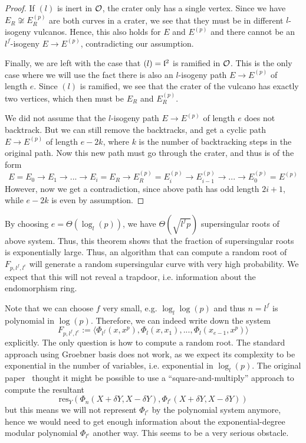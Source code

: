 \begin{proof}
    If $(l)$ is inert in $\mathcal{O}$, the crater only has a single vertex.
    Since we have $E_R \not\cong E_R^{(p)}$ are both curves in a crater, we see that they must be in different $l$-isogeny vulcanos.
    Hence, this also holds for $E$ and $E^{(p)}$ and there cannot be an $l^f$-isogeny $E \to E^{(p)}$, contradicting our assumption.

    Finally, we are left with the case that $(l) = \mathfrak{l}^2$ is ramified in $\mathcal{O}$.
    This is the only case where we will use the fact there is also an $l$-isogeny path $E \to E^{(p)}$ of length $e$.
    Since $(l)$ is ramified, we see that the crater of the vulcano has exactly two vertices, which then must be $E_R$ and $E_R^{(p)}$.

    We did not assume that the $l$-isogeny path $E \to E^{(p)}$ of length $e$ does not backtrack.
    But we can still remove the backtracks, and get a cyclic path $E \to E^{(p)}$ of length $e - 2k$, where $k$ is the number of backtracking steps in the original path.
    Now this new path must go through the crater, and thus is of the form
    \begin{equation*}
        E = E_0 \to E_1 \to ... \to E_i = E_R \to E_R^{(p)} = E_i^{(p)} \to E_{i - 1}^{(p)} \to ... \to E_0^{(p)} = E^{(p)}
    \end{equation*}
    However, now we get a contradiction, since above path has odd length $2i + 1$, while $e - 2k$ is even by assumption.
\end{proof}
By choosing $e = \Theta(\log_l(p))$, we have $\Theta(\sqrt{l^fp})$ supersingular roots of above system.
Thus, this theorem shows that the fraction of supersingular roots is exponentially large.
Thus, an algorithm that can compute a random root of $F_{p, l^f, l^e}$ will generate a random supersingular curve with very high probability.
We expect that this will not reveal a trapdoor, i.e. information about the endomorphism ring.

Note that we can choose $f$ very small, e.g. $\log_l\log(p)$ and thus $n = l^f$ is polynomial in $\log(p)$.
Therefore, we can indeed write down the system
\begin{equation*}
    F_{p, l^f, l^e} := \langle \Phi_{l^f}(x, x^p), \Phi_l(x, x_1), ..., \Phi_l(x_{e - 1}, x^p) \rangle
\end{equation*}
explicitly.
The only question is how to compute a random root.
The standard approach using Groebner basis does not work, as we expect its complexity to be exponential in the number of variables, i.e. exponential in $\log_l(p)$.
The original paper~\cite{base_paper} thought it might be possible to use a ``square-and-multiply'' approach to compute the resultant
\begin{equation*}
    \mathrm{res}_Y(\Phi_n(X + \delta Y, X - \delta Y), \Phi_{l^e}(X + \delta Y, X - \delta Y))
\end{equation*} 
but this means we will not represent $\Phi_{l^e}$ by the polynomial system anymore, hence we would need to get enough information about the exponential-degree modular polynomial $\Phi_{l^e}$ another way.
This seems to be a very serious obstacle.


